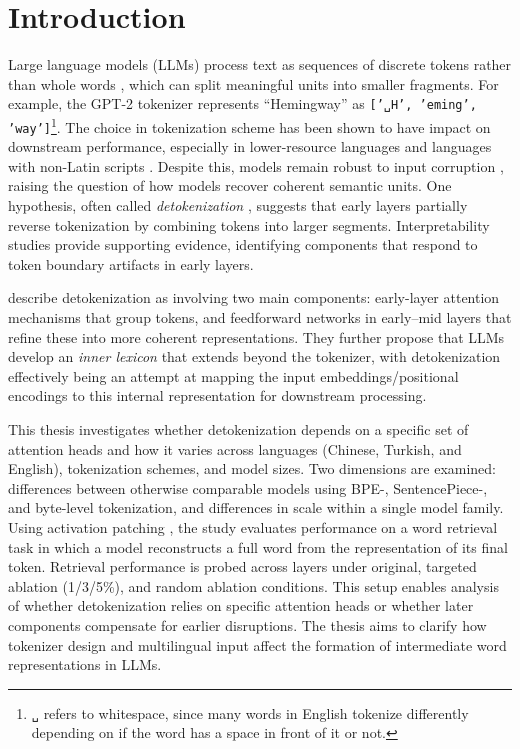 \chapter{Introduction} \label{cha:introduction}
\pagestyle{plain}

Large language models (LLMs) process text as sequences of discrete tokens rather than whole words \citep{mielke2021}, which can split meaningful units into smaller fragments. For example, the GPT-2 tokenizer represents ``Hemingway'' as \texttt{['␣H', 'eming', 'way']}\footnote{\texttt{␣} refers to whitespace, since many words in English tokenize differently depending on if the word has a space in front of it or not.}. The choice in tokenization scheme has been shown to have impact on downstream performance, especially in lower-resource languages and languages with non-Latin scripts \citep{ahia2023, petrov2023}. Despite this, models remain robust to input corruption \citep{cao2023}, raising the question of how models recover coherent semantic units. One hypothesis, often called \textit{detokenization} \citep{lad2024}, suggests that early layers partially reverse tokenization by combining tokens into larger segments. Interpretability studies \citep{elhage2022a} provide supporting evidence, identifying components that respond to token boundary artifacts in early layers.

\citet{kaplan2025} describe detokenization as involving two main components: early-layer attention mechanisms that group tokens, and feedforward networks in early–mid layers that refine these into more coherent representations. They further propose that LLMs develop an \textit{inner lexicon} that extends beyond the tokenizer, with detokenization effectively being an attempt at mapping the input embeddings/positional encodings to this internal representation for downstream processing.

This thesis investigates whether detokenization depends on a specific set of attention heads and how it varies across languages (Chinese, Turkish, and English), tokenization schemes, and model sizes. Two dimensions are examined: differences between otherwise comparable models using BPE-, SentencePiece-, and byte-level tokenization, and differences in scale within a single model family. Using activation patching \citep{vig2019, ghandeharioun2024}, the study evaluates performance on a word retrieval task in which a model reconstructs a full word from the representation of its final token. Retrieval performance is probed across layers under original, targeted ablation (1/3/5\%), and random ablation conditions. This setup enables analysis of whether detokenization relies on specific attention heads or whether later components compensate for earlier disruptions. The thesis aims to clarify how tokenizer design and multilingual input affect the formation of intermediate word representations in LLMs.

